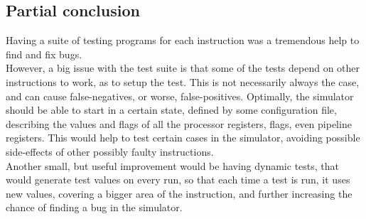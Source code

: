 \subsection{Partial conclusion}
Having a suite of testing programs for each instruction was a tremendous help to
find and fix bugs.\\
However, a big issue with the test suite is that some of the tests depend on
other instructions to work, as to setup the test. This is not necessarily
always the case, and can cause false-negatives, or worse, false-positives.
Optimally, the simulator should be able to start in a certain state, defined by
some configuration file, describing the values and flags of all the processor
registers, flags, even pipeline registers. This would help to test certain
cases in the simulator, avoiding possible side-effects of other possibly faulty
instructions.\\
Another small, but useful improvement would be having dynamic tests, that would
generate test values on every run, so that each time a test is run, it uses new
values, covering a bigger area of the instruction, and further increasing the
chance of finding a bug in the simulator.
